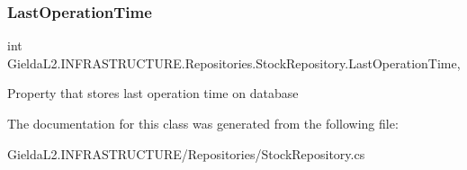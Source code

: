 \subsubsection{\texorpdfstring{LastOperationTime}{LastOperationTime}}
{\footnotesize\ttfamily int Gielda\+L2.\+I\+N\+F\+R\+A\+S\+T\+R\+U\+C\+T\+U\+R\+E.\+Repositories.\+Stock\+Repository.\+Last\+Operation\+Time\hspace{0.3cm}{\ttfamily [get]}, {\ttfamily [set]}}



Property that stores last operation time on database 



The documentation for this class was generated from the following file\+:\begin{DoxyCompactItemize}
\item 
Gielda\+L2.\+I\+N\+F\+R\+A\+S\+T\+R\+U\+C\+T\+U\+R\+E/\+Repositories/Stock\+Repository.\+cs\end{DoxyCompactItemize}
